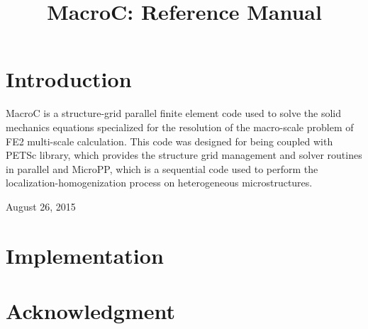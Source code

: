 \documentclass[conference, onecolumn]{IEEEtran}
\begin{document}
\title{MacroC: Reference Manual}

\author{
}

\maketitle


\IEEEpeerreviewmaketitle

\section{Introduction}
\IEEEPARstart
MacroC is a structure-grid parallel finite element code used to solve the solid mechanics equations specialized for the resolution of the macro-scale problem of FE2 multi-scale calculation. This code was designed for being coupled with PETSc library, which provides the structure grid management and solver routines in parallel and MicroPP, which is a sequential code used to perform the localization-homogenization process on heterogeneous microstructures.

\hfill August 26, 2015

%

\section{Implementation}

\section*{Acknowledgment}

\end{document}
